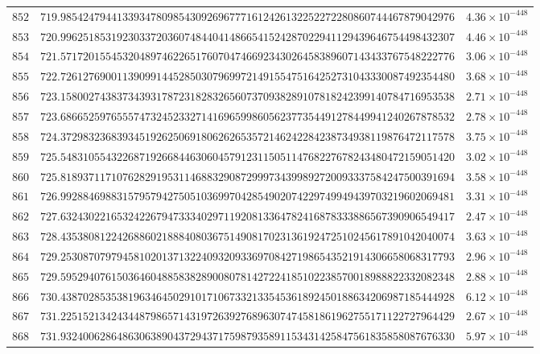\documentclass[12pt,reqno]{amsart}
\theoremstyle{remark}
\begin{document}
\begin{longtable}{clc}
$852$ & $719.9854247944133934780985430926967771612426132252272280860744467879042976$ & $4.36\times 10^{-448}$ \\
$853$ & $720.9962518531923033720360748440414866541524287022941129439646754498432307$ & $4.46\times 10^{-448}$ \\
$854$ & $721.5717201554532048974622651760704746692343026458389607143433767548222776$ & $3.06\times 10^{-448}$ \\
$855$ & $722.7261276900113909914452850307969972149155475164252731043330087492354480$ & $3.68\times 10^{-448}$ \\
$856$ & $723.1580027438373439317872318283265607370938289107818242399140784716953538$ & $2.71\times 10^{-448}$ \\
$857$ & $723.6866525976555747324523327141696599860562377354491278449941240267878532$ & $2.78\times 10^{-448}$ \\
$858$ & $724.3729832368393451926250691806262653572146242284238734938119876472117578$ & $3.75\times 10^{-448}$ \\
$859$ & $725.5483105543226871926684463060457912311505114768227678243480472159051420$ & $3.02\times 10^{-448}$ \\
$860$ & $725.8189371171076282919531146883290872999734399892720093337584247500391694$ & $3.58\times 10^{-448}$ \\
$861$ & $726.9928846988315795794275051036997042854902074229749949439703219602069481$ & $3.31\times 10^{-448}$ \\
$862$ & $727.6324302216532422679473334029711920813364782416878333886567390906549417$ & $2.47\times 10^{-448}$ \\
$863$ & $728.4353808122426886021888408036751490817023136192472510245617891042040074$ & $3.63\times 10^{-448}$ \\
$864$ & $729.2530870797945810201371322409320933697084271986543521914306658068317793$ & $2.96\times 10^{-448}$ \\
$865$ & $729.5952940761503646048858382890080781427224185102238570018988822332082348$ & $2.88\times 10^{-448}$ \\
$866$ & $730.4387028535381963464502910171067332133545361892450188634206987185444928$ & $6.12\times 10^{-448}$ \\
$867$ & $731.2251521342434487986571431972639276896307474581861962755171122727964429$ & $2.67\times 10^{-448}$ \\
$868$ & $731.9324006286486306389043729437175987935891153431425847561835858087676330$ & $5.97\times 10^{-448}$ \\

\end{longtable}
\end{document}
